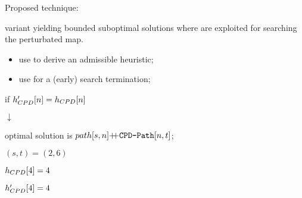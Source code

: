 \begin{frame}{Proposed technique: \CPDSearch{}}
    \begin{block}{\CPDSearch{}}
        \A{} variant yielding bounded suboptimal solutions where \CPDPathsName{} are exploited for searching the perturbated map.
    \end{block}

    \begin{itemize}
        \item {\color{gray}use \CPD{} to derive an admissible heuristic;}
        \item {use \CPD{} for a (early) search termination;}
    \end{itemize}

    \begin{minipage}{0.65\textwidth}

        \begin{center}
            if $\CPDPathCostNew{n}{t} = \CPDPathCostOriginal{n}{t}$
            
            $\downarrow$
            
            optimal solution is $\pathOnGraph{s}{n} \doublePlus{} \CPDPath{n}{t}$;

            \medskip

            $(s, t) = (2, 6)$
        
            $\CPDPathCostOriginal{4}{6} = 4$

            $\CPDPathCostNew{4}{6} = 4$
        \end{center}
    \end{minipage}\hfill%
    \begin{minipage}{0.35\textwidth}
\end{minipage}
\end{frame}
